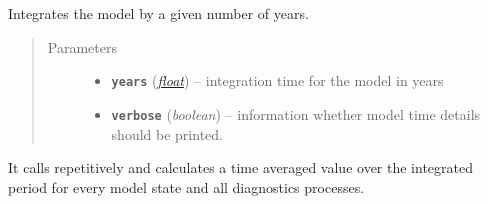 \documentclass[letterpaper,10pt,english]{sphinxmanual}
\begin{document}
\begin{fulllineitems}
\begin{fulllineitems}
\begin{quote}
\begin{description}
\begin{itemize}
\end{itemize}

\end{description}\end{quote}

\end{fulllineitems}


\begin{fulllineitems}
\label{api/climlab.process:climlab.process.time_dependent_process.TimeDependentProcess.integrate_years}
Integrates the model by a given number of years.
\begin{quote}\begin{description}
\item[{Parameters}] \leavevmode\begin{itemize}
\item {} 
\textbf{\texttt{years}} (\href{http://docs.python.org/2.7/library/functions.html\#float}{\emph{float}}) -- integration time for the model in years

\item {} 
\textbf{\texttt{verbose}} (\emph{boolean}) -- information whether model time details should be 
printed.

\end{itemize}

\end{description}\end{quote}

It calls {\hyperref[api/climlab.process:climlab.process.time_dependent_process.TimeDependentProcess.step_forward]{\emph{}}} repetitively and calculates a time 
averaged value over the integrated period for every model state and all
diagnostics processes.

\end{fulllineitems}



\end{fulllineitems}
\end{document}
